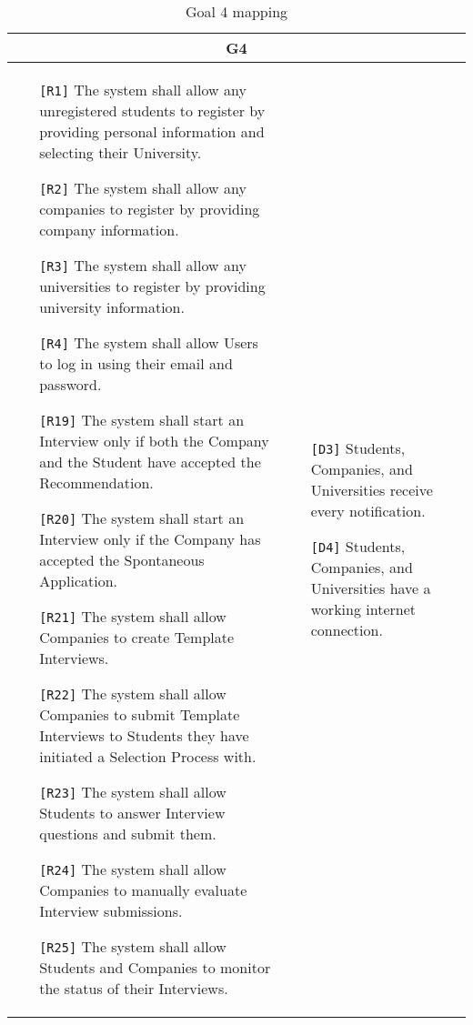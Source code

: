 \begin{table}[H]
    \centering
    \begin{tabular}{|p{8cm}|p{8cm}|}
         \hline
        \multicolumn{2}{|c|}{G4} \\
        \hline
        \begin{itemize}
            \item[\texttt{[R1]}] The system shall allow any unregistered students to register by providing personal information and selecting their University. 
            \item[\texttt{[R2]}] The system shall allow any companies to register by providing company information. 
            \item[\texttt{[R3]}] The system shall allow any universities to register by providing university information. 
            \item[\texttt{[R4]}] The system shall allow Users to log in using their email and password. 
            \item[\texttt{[R19]}] The system shall start an Interview only if both the Company and the Student have accepted the Recommendation.
            \item[\texttt{[R20]}] The system shall start an Interview only if the Company has accepted the Spontaneous Application.
            \item[\texttt{[R21]}] The system shall allow Companies to create Template Interviews.
            \item[\texttt{[R22]}] The system shall allow Companies to submit Template Interviews to Students they have initiated a Selection Process with.
            \item[\texttt{[R23]}] The system shall allow Students to answer Interview questions and submit them.
            \item[\texttt{[R24]}] The system shall allow Companies to manually evaluate Interview submissions.
            \item[\texttt{[R25]}] The system shall allow Students and Companies to monitor the status of their Interviews.
        \end{itemize} & 
        \begin{itemize}
            \item[\texttt{[D3]}] Students, Companies, and Universities receive every notification.
            \item[\texttt{[D4]}] Students, Companies, and Universities have a working internet connection.
        \end{itemize} \\ \hline
    \end{tabular}
    \caption{Goal 4 mapping}
    \label{tab:G4}
\end{table}


